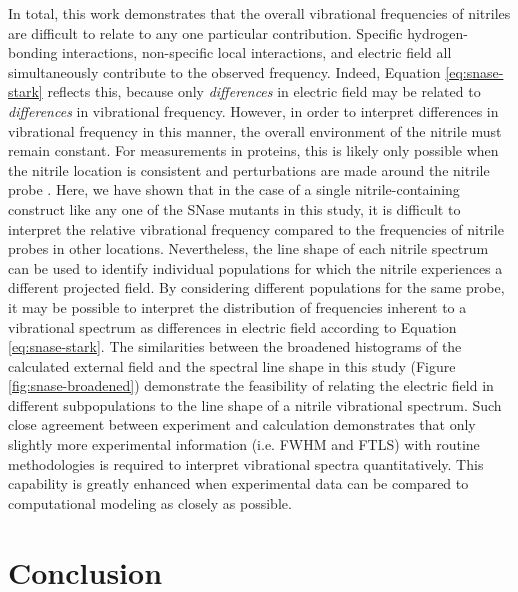 In total, this work demonstrates that the overall vibrational frequencies of nitriles are difficult to relate to any one particular contribution. 
Specific hydrogen-bonding interactions, non-specific local interactions, and electric field all simultaneously contribute to the observed frequency. 
Indeed, Equation \ref{eq:snase-stark} reflects this, because only \emph{differences} in electric field may be related to \emph{differences} in vibrational frequency. 
However, in order to interpret differences in vibrational frequency in this manner, the overall environment of the nitrile must remain constant. 
For measurements in proteins, this is likely only possible when the nitrile location is consistent and perturbations are made around the nitrile probe \cite{Slocum2016, Stafford2012, Novelli2018}. 
Here, we have shown that in the case of a single nitrile-containing construct like any one of the SNase mutants in this study, it is difficult to interpret the relative vibrational frequency compared to the frequencies of nitrile probes in other locations. 
Nevertheless, the line shape of each nitrile spectrum can be used to identify individual populations for which the nitrile experiences a different projected field. 
By considering different populations for the same probe, it may be possible to interpret the distribution of frequencies inherent to a vibrational spectrum as differences in electric field according to Equation \ref{eq:snase-stark}. 
The similarities between the broadened histograms of the calculated external field and the spectral line shape in this study (Figure \ref{fig:snase-broadened}) demonstrate the feasibility of relating the electric field in different subpopulations to the line shape of a nitrile vibrational spectrum. 
Such close agreement between experiment and calculation demonstrates that only slightly more experimental information (i.e. FWHM and FTLS) with routine methodologies is required to interpret vibrational spectra quantitatively. 
This capability is greatly enhanced when experimental data can be compared to computational modeling as closely as possible.

\section{Conclusion} \label{snase-conclusion}

